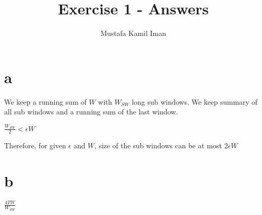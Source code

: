 \documentclass{article}
\title{Exercise 1 - Answers}
\author{Mustafa Kamil Iman}
\begin{document}
\date{}
\maketitle

\section{a}
We keep a running sum of $W$ with $W_{SW}$ long sub windows. We keep summary of all sub windows and a running sum of the last window.

$\frac{W_{SW}}{2} < \epsilon W$ 

Therefore, for given $\epsilon$ and $W$, size of the sub windows can be at most $2\epsilon W$

\section{b}

$\frac{4TW}{W_{SW}}$
\end{document}
